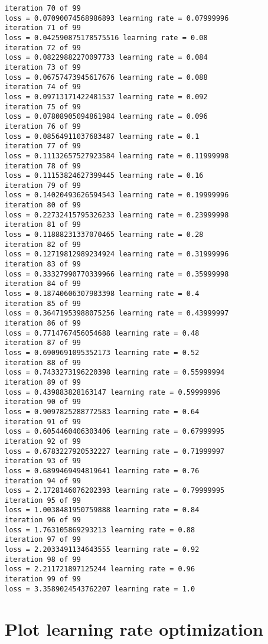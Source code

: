 \documentclass[11pt]{article}
\begin{document}
\begin{Verbatim}[commandchars=\\\{\}]
iteration 70 of 99
loss = 0.07090074568986893 learning rate = 0.07999996
iteration 71 of 99
loss = 0.042590875178575516 learning rate = 0.08
iteration 72 of 99
loss = 0.08229882270097733 learning rate = 0.084
iteration 73 of 99
loss = 0.06757473945617676 learning rate = 0.088
iteration 74 of 99
loss = 0.09713171422481537 learning rate = 0.092
iteration 75 of 99
loss = 0.07808905094861984 learning rate = 0.096
iteration 76 of 99
loss = 0.08564911037683487 learning rate = 0.1
iteration 77 of 99
loss = 0.11132657527923584 learning rate = 0.11999998
iteration 78 of 99
loss = 0.11153824627399445 learning rate = 0.16
iteration 79 of 99
loss = 0.14020493626594543 learning rate = 0.19999996
iteration 80 of 99
loss = 0.22732415795326233 learning rate = 0.23999998
iteration 81 of 99
loss = 0.11888231337070465 learning rate = 0.28
iteration 82 of 99
loss = 0.12719812989234924 learning rate = 0.31999996
iteration 83 of 99
loss = 0.33327990770339966 learning rate = 0.35999998
iteration 84 of 99
loss = 0.18740606307983398 learning rate = 0.4
iteration 85 of 99
loss = 0.36471953988075256 learning rate = 0.43999997
iteration 86 of 99
loss = 0.7714767456054688 learning rate = 0.48
iteration 87 of 99
loss = 0.6909691095352173 learning rate = 0.52
iteration 88 of 99
loss = 0.7433273196220398 learning rate = 0.55999994
iteration 89 of 99
loss = 0.439883828163147 learning rate = 0.59999996
iteration 90 of 99
loss = 0.9097825288772583 learning rate = 0.64
iteration 91 of 99
loss = 0.6054460406303406 learning rate = 0.67999995
iteration 92 of 99
loss = 0.6783227920532227 learning rate = 0.71999997
iteration 93 of 99
loss = 0.6899469494819641 learning rate = 0.76
iteration 94 of 99
loss = 2.1728146076202393 learning rate = 0.79999995
iteration 95 of 99
loss = 1.0038481950759888 learning rate = 0.84
iteration 96 of 99
loss = 1.763105869293213 learning rate = 0.88
iteration 97 of 99
loss = 2.2033491134643555 learning rate = 0.92
iteration 98 of 99
loss = 2.211721897125244 learning rate = 0.96
iteration 99 of 99
loss = 3.3589024543762207 learning rate = 1.0
    \end{Verbatim}

    \hypertarget{plot-learning-rate-optimization}{%
\section{Plot learning rate
optimization}\label{plot-learning-rate-optimization}}
\end{document}
